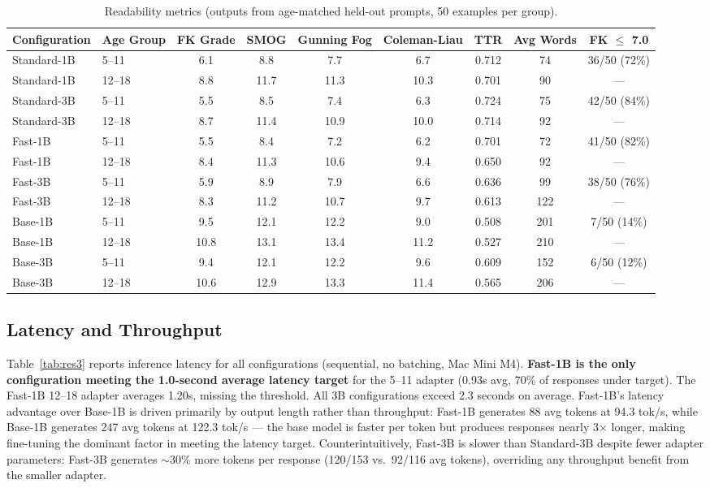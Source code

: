 \documentclass[journal]{IEEEtai}
\begin{document}
\begin{table}[!t]
  \caption{Readability metrics (outputs from age-matched held-out prompts, 50 examples per group).}
  \label{tab:res2}
  \small
  \begin{tabular}{llccccccc}
    \hline
    Configuration & Age Group & FK Grade & SMOG & Gunning Fog & Coleman-Liau & TTR & Avg Words & FK $\leq$ 7.0 \\
    \hline
    Standard-1B & 5--11  & 6.1  & 8.8  & 7.7  & 6.7  & 0.712 & 74  & 36/50 (72\%) \\
    Standard-1B & 12--18 & 8.8  & 11.7 & 11.3 & 10.3 & 0.701 & 90  & ---          \\
    Standard-3B & 5--11  & 5.5  & 8.5  & 7.4  & 6.3  & 0.724 & 75  & 42/50 (84\%) \\
    Standard-3B & 12--18 & 8.7  & 11.4 & 10.9 & 10.0 & 0.714 & 92  & ---          \\
    Fast-1B     & 5--11  & 5.5  & 8.4  & 7.2  & 6.2  & 0.701 & 72  & 41/50 (82\%) \\
    Fast-1B     & 12--18 & 8.4  & 11.3 & 10.6 & 9.4  & 0.650 & 92  & ---          \\
    Fast-3B     & 5--11  & 5.9  & 8.9  & 7.9  & 6.6  & 0.636 & 99  & 38/50 (76\%) \\
    Fast-3B     & 12--18 & 8.3  & 11.2 & 10.7 & 9.7  & 0.613 & 122 & ---          \\
    Base-1B     & 5--11  & 9.5  & 12.1 & 12.2 & 9.0  & 0.508 & 201 & 7/50 (14\%)  \\
    Base-1B     & 12--18 & 10.8 & 13.1 & 13.4 & 11.2 & 0.527 & 210 & ---          \\
    Base-3B     & 5--11  & 9.4  & 12.1 & 12.2 & 9.6  & 0.609 & 152 & 6/50 (12\%)  \\
    Base-3B     & 12--18 & 10.6 & 12.9 & 13.3 & 11.4 & 0.565 & 206 & ---          \\
    \hline
  \end{tabular}
\end{table}

\subsection{Latency and Throughput}

Table~\ref{tab:res3} reports inference latency for all configurations (sequential, no batching, Mac Mini M4). \textbf{Fast-1B is the only configuration meeting the 1.0-second average latency target} for the 5--11 adapter (0.93s avg, 70\% of responses under target). The Fast-1B 12--18 adapter averages 1.20s, missing the threshold. All 3B configurations exceed 2.3 seconds on average. Fast-1B's latency advantage over Base-1B is driven primarily by output length rather than throughput: Fast-1B generates 88 avg tokens at 94.3 tok/s, while Base-1B generates 247 avg tokens at 122.3 tok/s --- the base model is faster per token but produces responses nearly 3$\times$ longer, making fine-tuning the dominant factor in meeting the latency target. Counterintuitively, Fast-3B is slower than Standard-3B despite fewer adapter parameters: Fast-3B generates $\sim$30\% more tokens per response (120/153 vs.\ 92/116 avg tokens), overriding any throughput benefit from the smaller adapter.
\end{document}
